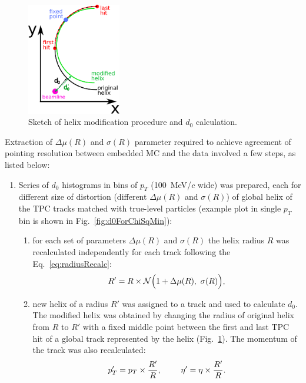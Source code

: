 \begin{figure}\vspace*{-9pt}
  \centering
  \includegraphics[width=0.365\textwidth]{graphics/tpcHelixAdj/trackSmearing.pdf}
  \caption[Sketch of helix modification procedure and $d_{0}$ calculation.]
   {Sketch of helix modification procedure and $d_{0}$ calculation.}
   \label{fig:d0sketch}%
\end{figure}

Extraction of $\Delta\mu(R)$ and $\sigma(R)$ parameter required to achieve agreement of pointing resolution between embedded MC and the data involved a few steps, as listed below:
  \begin{enumerate}
   \item Series of $d_{0}$ histograms in bins of $p_{T}$ (100~MeV/$c$ wide) was prepared, each for different size of distortion (different $\Delta\mu(R)$ and $\sigma(R)$) of global helix of the TPC tracks matched with true-level particles (example plot in single $p_{T}$ bin is shown in Fig.~\ref{fig:d0ForChiSqMin}):
   \begin{enumerate}
   \item for each set of parameters $\Delta\mu(R)$ and $\sigma(R)$ the helix radius $R$ was recalculated independently for each track following the Eq.~\eqref{eq:radiusRecalc}:\vspace{-5pt}
   \begin{equation}\label{eq:radiusRecalc}R'=R\times \mathcal{N}\Big(1+\Delta\mu(R),~\sigma(R)\Big),\vspace{-5pt}\end{equation}
   \item new helix of a radius $R'$ was assigned to a track and used to calculate $d_{0}$. The modified helix was obtained by changing the radius of original helix from $R$ to $R'$ with a fixed middle point between the first and last TPC hit of a global track represented by the helix (Fig.~\ref{fig:d0sketch}). The momentum of the track was also recalculated:\vspace{-5pt}
   \begin{equation}p_{T}'=p_{T}\times \frac{R'}{R},~~~~~~~\eta'=\eta\times \frac{R'}{R}.\vspace{-5pt}\end{equation}
   \end{enumerate}%
  \end{enumerate}%
 
